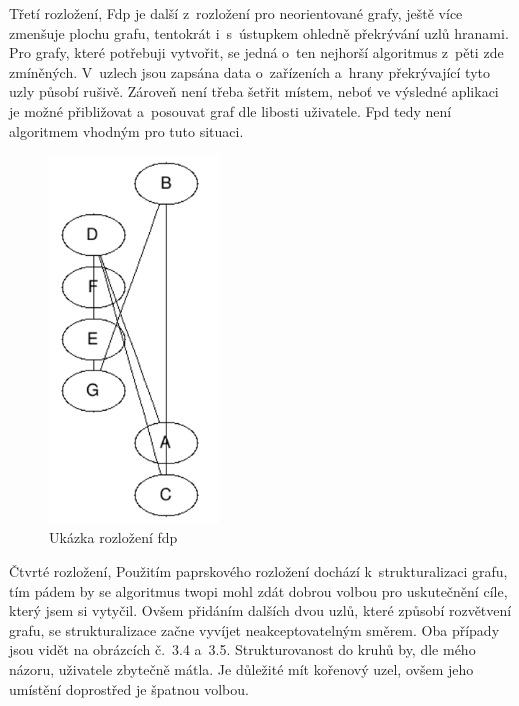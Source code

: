 \documentclass[color,table,oneside,nolot,nolof]{fithesis}
\begin{document}
	Třetí rozložení, \cite{graphviz_layout} 
	Fdp je další z~rozložení pro neorientované grafy, ještě více zmenšuje plochu grafu, tentokrát i~s~ústupkem ohledně překrývání
	uzlů hranami. Pro grafy, které potřebuji vytvořit, se jedná o~ten nejhorší algoritmus z~pěti zde zmíněných. V~uzlech jsou zapsána data o~zařízeních a~hrany překrývající tyto uzly
	působí rušivě. Zároveň není třeba šetřit místem, neboť ve výsledné aplikaci je možné přibližovat a~posouvat graf dle libosti uživatele. Fpd tedy není algoritmem vhodným pro tuto
	situaci.

\begin{figure}[h!]
	\label{fig:Ukázka rozložení fdp}
	\caption{Ukázka rozložení fdp}
	\centering
	\includegraphics[width=0.4\textwidth]{pictures/fdp_example.png} 
\end{figure}

	Čtvrté rozložení, \cite{graphviz_layout}
	Použitím paprskového rozložení dochází k~strukturalizaci grafu, tím pádem by se algoritmus twopi mohl zdát 
	dobrou volbou pro uskutečnění cíle, který jsem si vytyčil. Ovšem přidáním dalších dvou uzlů, které způsobí rozvětvení grafu, se strukturalizace začne vyvíjet neakceptovatelným směrem.
	Oba případy jsou vidět na obrázcích č.~3.4 a~3.5. Strukturovanost do kruhů by, dle mého názoru, uživatele zbytečně mátla. Je důležité mít kořenový uzel, ovšem jeho umístění doprostřed je špatnou
	volbou.
\end{document}
